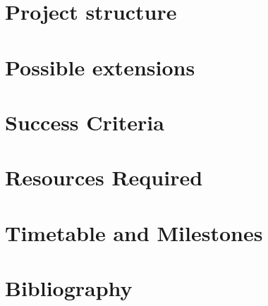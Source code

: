 \documentclass[12pt,a4]{article}
\begin{document}
	\section{Project structure}

	\section{Possible extensions}

	\section{Success Criteria}


	\section{Resources Required}
	\label{sec:Resources}

	\section{Timetable and Milestones}

	\section{Bibliography}
\end{document}
